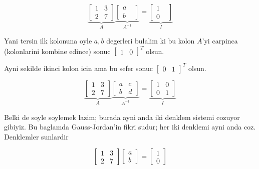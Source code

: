 \documentclass[12pt,fleqn]{article}\usepackage{../common}
\begin{document}
$$ 
\underbrace{
\left[\begin{array}{rrr}
1 & 3 \\
2 & 7
\end{array}\right]
}_{A}
\underbrace{
\left[\begin{array}{rrr}
a &  \\
b & 
\end{array}\right]
}_{A^{-1}}
=
\underbrace{
\left[\begin{array}{rrr}
1 &  \\
0 & 
\end{array}\right]
}_{I}
 $$

Yani tersin ilk kolonuna oyle $a,b$ degerleri bulalim ki bu kolon $A$'yi
carpinca (kolonlarini kombine edince) sonuc $\left[\begin{array}{rr}1 &
    0\end{array}\right]^T$ olsun. 

Ayni sekilde ikinci kolon icin ama bu sefer sonuc $\left[\begin{array}{rr}0 &
 1\end{array}\right]^T$ olsun. 


$$ 
\underbrace{
\left[\begin{array}{rrr}
1 & 3 \\
2 & 7
\end{array}\right]
}_{A}
\underbrace{
\left[\begin{array}{rrr}
a & c \\
b & d
\end{array}\right]
}_{A^{-1}}
=
\underbrace{
\left[\begin{array}{rrr}
1 & 0 \\
0 & 1
\end{array}\right]
}_{I}
 $$

Belki de soyle soylemek lazim; burada ayni anda iki denklem sistemi
cozuyor gibiyiz. Bu baglamda Gauss-Jordan'in fikri sudur; her iki denklemi
ayni anda coz. Denklemler sunlardir

$$ 
\left[\begin{array}{rrr}
1 & 3 \\
2 & 7
\end{array}\right]
\left[\begin{array}{r}
a  \\
b 
\end{array}\right]
=
\left[\begin{array}{rrr}
1  \\
0
\end{array}\right]
 $$
\end{document}
